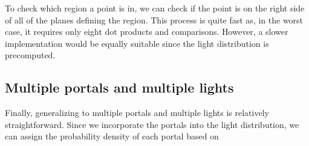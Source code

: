 To check which region a point is in, we can check if the point is on the right side of all of the planes defining the region. This process is quite fast as, in the worst case, it requires only eight dot products and comparisons. However, a slower implementation would be equally suitable since the light distribution is precomputed.

\subsection{Multiple portals and multiple lights}
Finally, generalizing to multiple portals and multiple lights is relatively straightforward. Since we incorporate the portals into the light distribution, we can assign the probability density of each portal based on 



